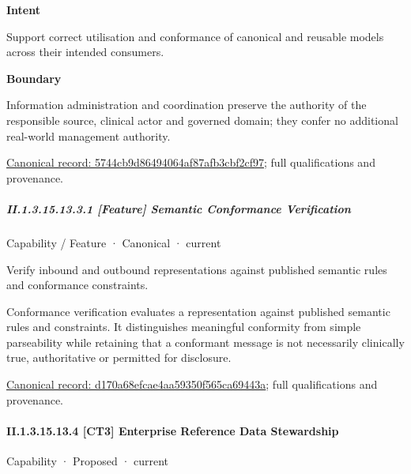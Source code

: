 \textbf{Intent}



Support correct utilisation and conformance of canonical and reusable models across their intended consumers.



\textbf{Boundary}



Information administration and coordination preserve the authority of the responsible source, clinical actor and governed domain; they confer no additional real-world management authority.


{\footnotesize \href{../../../../continuum/strategy/capability/5744cb9d86494064af87afb3cbf2cf97.md}{Canonical record: 5744cb9d86494064af87afb3cbf2cf97}; full qualifications and provenance.}\par
\subparagraph*{II.1.3.15.13.3.1 [Feature] Semantic Conformance Verification}
\label{navigation:II.1.3.15.13.3.1}

\label{element:d170a68efcae4aa59350f565ca69443a}
{\small Capability / Feature · Canonical · current}\par

Verify inbound and outbound representations against published semantic rules and conformance constraints.



Conformance verification evaluates a representation against published semantic rules and constraints. It distinguishes meaningful conformity from simple parseability while retaining that a conformant message is not necessarily clinically true, authoritative or permitted for disclosure.


{\footnotesize \href{../../../../continuum/strategy/capability/feature/d170a68efcae4aa59350f565ca69443a.md}{Canonical record: d170a68efcae4aa59350f565ca69443a}; full qualifications and provenance.}\par
\paragraph*{II.1.3.15.13.4 [CT3] Enterprise Reference Data Stewardship}
\label{navigation:II.1.3.15.13.4}

\label{element:971d4b079ad24e89b70a8ed8dec0c8bf}
{\small Capability · Proposed · current}\par

